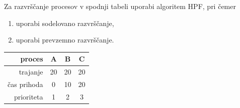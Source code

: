\begin{Exercise}
Za razvrščanje procesov v spodnji tabeli uporabi algoritem HPF, pri čemer
\begin{enumerate}
	\item uporabi sodelovano razvrščanje,
	\item uporabi prevzemno razvrščanje. 
\end{enumerate} 
\par\vspace{5pt}
{\centering
\begin{tabular}{r|ccc}
	proces & A & B & C \\
	\hline
	trajanje & 20 & 20 & 20  \\
	čas prihoda & 0 & 10 & 20 \\
	prioriteta & 1 & 2 & 3 \\
\end{tabular}\\}
\end{Exercise}
